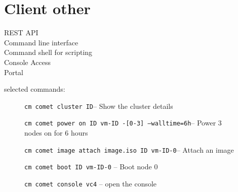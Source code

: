 \section{Client other}


\begin{description}
\item[REST API]
\item[Command line interface]
\item[Command shell for scripting]
\item[Console Access]
\item[Portal]
\end{description}

selected commands:


\begin{figure}[htb] 

{\tt cm comet cluster  ID}\newline -- Show the cluster details

{\tt cm comet power on ID vm-ID -[0-3] --walltime=6h}\newline -- Power 3 nodes
on for 6 hours

{\tt cm comet image attach image.iso ID vm-ID-0}\newline -- Attach an image

{\tt cm comet boot ID vm-ID-0}\newline
-- Boot node 0

{\tt cm comet console vc4}\newline
-- open the console 

\end{figure}


